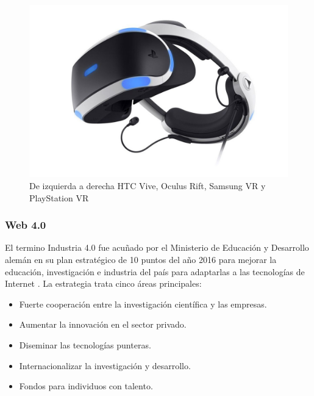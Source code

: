\begin{figure}[!htb]
\begin {minipage}{0.24\textwidth}
   \end{minipage}
      \begin {minipage}{0.24\textwidth}
     \centering
     \includegraphics[width=0.7\linewidth, left]{images/estadodelarte/mercado/foto-sony-vr}
   \end{minipage}
   \caption{De izquierda a derecha HTC Vive, Oculus Rift, Samsung VR y PlayStation VR}
\end{figure}

\subsubsection{Web 4.0}
El termino Industria 4.0 fue acuñado por el Ministerio de Educación y Desarrollo alemán en su plan estratégico de 10 puntos del año 2016 para mejorar la educación, investigación e industria del país para adaptarlas a las tecnologías de Internet \cite{web_4_0}. La estrategia trata cinco áreas principales:
\begin{itemize}
\item Fuerte cooperación entre la investigación científica y las empresas.
\item Aumentar la innovación en el sector privado.
\item Diseminar las tecnologías punteras.
\item Internacionalizar la investigación y desarrollo.
\item Fondos para individuos con talento.
\end{itemize}

